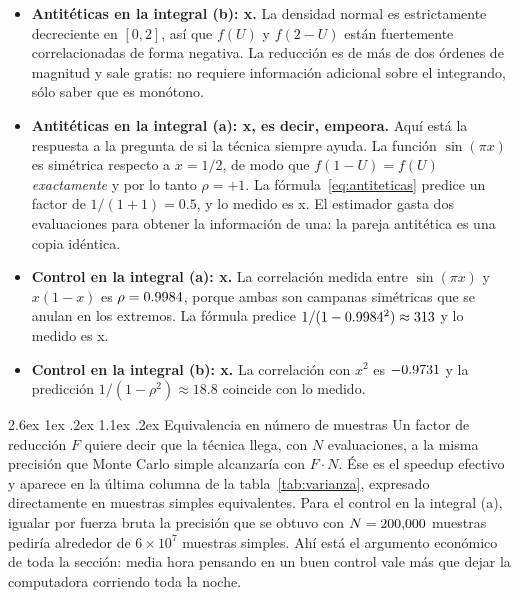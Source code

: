 \documentclass[11pt,letterpaper]{article}
\makeatletter
\renewcommand\paragraph{\@startsection{paragraph}{4}{\z@}%
  {2.6ex \@plus 1ex \@minus .2ex}%
  {1.1ex \@plus .2ex}%
  {\normalfont\normalsize\bfseries}}
\makeatother
\begin{document}
\begin{itemize}[itemsep=3pt]
  \item \textbf{Antitéticas en la integral (b): \FactorAntiNormal x.} La
        densidad normal es estrictamente decreciente en $[0,2]$, así que
        $f(U)$ y $f(2-U)$ están fuertemente correlacionadas de forma
        negativa. La reducción es de más de dos órdenes de magnitud y sale
        gratis: no requiere información adicional sobre el integrando, sólo
        saber que es monótono.
  \item \textbf{Antitéticas en la integral (a): \FactorAntiSeno x, es decir,
        empeora.} Aquí está la respuesta a la pregunta de si la técnica
        siempre ayuda. La función $\sin(\pi x)$ es simétrica respecto a
        $x = 1/2$, de modo que $f(1-U) = f(U)$ \emph{exactamente} y por lo
        tanto $\rho = +1$. La fórmula~\eqref{eq:antiteticas} predice un
        factor de $1/(1+1) = 0.5$, y lo medido es \FactorAntiSeno x. El
        estimador gasta dos evaluaciones para obtener la información de una:
        la pareja antitética es una copia idéntica.
  \item \textbf{Control en la integral (a): \FactorControlSeno x.} La
        correlación medida entre $\sin(\pi x)$ y $x(1-x)$ es
        $\rho = 0.9984$, porque ambas son campanas simétricas que se
        anulan en los extremos. La fórmula predice
        $1/(1-0.9984^2) \approx 313$ y lo medido es
        \FactorControlSeno x.
  \item \textbf{Control en la integral (b): \FactorControlNormal x.} La
        correlación con $x^2$ es $-0.9731$ y la predicción
        $1/(1-\rho^2) \approx 18.8$ coincide con lo medido.
\end{itemize}

\paragraph{Equivalencia en número de muestras} Un factor de reducción $F$ quiere
decir que la técnica llega, con $N$ evaluaciones, a la misma precisión que
Monte Carlo simple alcanzaría con $F\cdot N$. Ése es el speedup efectivo y
aparece en la última columna de la tabla~\ref{tab:varianza}, expresado
directamente en muestras simples equivalentes. Para el control en la integral
(a), igualar por fuerza bruta la precisión que se obtuvo con $N = 200{,}000$
muestras pediría alrededor de $6\times10^{7}$ muestras simples. Ahí está el
argumento económico de toda la sección: media hora pensando en un buen
control vale más que dejar la computadora corriendo toda la noche.
\end{document}
